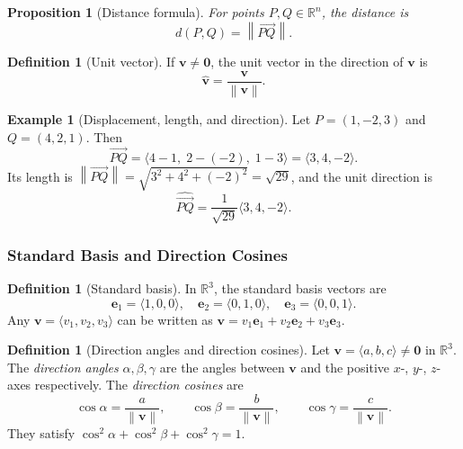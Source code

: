 \documentclass[12pt]{article}
\numberwithin{equation}{section}
\newcommand{\RR}{\mathbb{R}}
\newcommand{\vect}[1]{\boldsymbol{#1}}   %
\newcommand{\norm}[1]{\left\lVert #1\right\rVert}
\theoremstyle{plain}
\newtheorem{proposition}[theorem]{Proposition}
\theoremstyle{definition}
\newtheorem{definition}[theorem]{Definition}
\newtheorem{example}[theorem]{Example}
\theoremstyle{remark}
\begin{document}
\begin{proposition}[Distance formula]
For points $P,Q\in \RR^n$, the distance is
\[
d(P,Q)=\norm{\overrightarrow{PQ}}.
\]
\end{proposition}

\begin{definition}[Unit vector]
If $\vect{v}\neq \vect{0}$, the unit vector in the direction of $\vect{v}$ is
\begin{equation}\label{eq:unit}
\hat{\vect{v}}=\frac{\vect{v}}{\norm{\vect{v}}}.
\end{equation}
\end{definition}

\begin{example}[Displacement, length, and direction]
Let $P=(1,-2,3)$ and $Q=(4,2,1)$. Then
\[
\overrightarrow{PQ}=\langle 4-1,\;2-(-2),\;1-3\rangle=\langle 3,4,-2\rangle.
\]
Its length is $\norm{\overrightarrow{PQ}}=\sqrt{3^2+4^2+(-2)^2}=\sqrt{29}$, and the unit direction is
\[
\widehat{\overrightarrow{PQ}}=\frac{1}{\sqrt{29}}\langle 3,4,-2\rangle.
\]
\end{example}

\subsubsection{Standard Basis and Direction Cosines}

\begin{definition}[Standard basis]
In $\RR^3$, the standard basis vectors are
\[
\vect{e}_1=\langle 1,0,0\rangle,\quad
\vect{e}_2=\langle 0,1,0\rangle,\quad
\vect{e}_3=\langle 0,0,1\rangle.
\]
Any $\vect{v}=\langle v_1,v_2,v_3\rangle$ can be written as $\vect{v}=v_1\vect{e}_1+v_2\vect{e}_2+v_3\vect{e}_3$.
\end{definition}

\begin{definition}[Direction angles and direction cosines]
Let $\vect{v}=\langle a,b,c\rangle\neq \vect{0}$ in $\RR^3$. The \emph{direction angles} $\alpha,\beta,\gamma$ are the angles between $\vect{v}$ and the positive $x$-, $y$-, $z$-axes respectively. The \emph{direction cosines} are
\begin{equation}\label{eq:dircos}
\cos\alpha=\frac{a}{\norm{\vect{v}}},\qquad
\cos\beta=\frac{b}{\norm{\vect{v}}},\qquad
\cos\gamma=\frac{c}{\norm{\vect{v}}}.
\end{equation}
They satisfy $\cos^2\alpha+\cos^2\beta+\cos^2\gamma=1$.
\end{definition}
\end{document}
